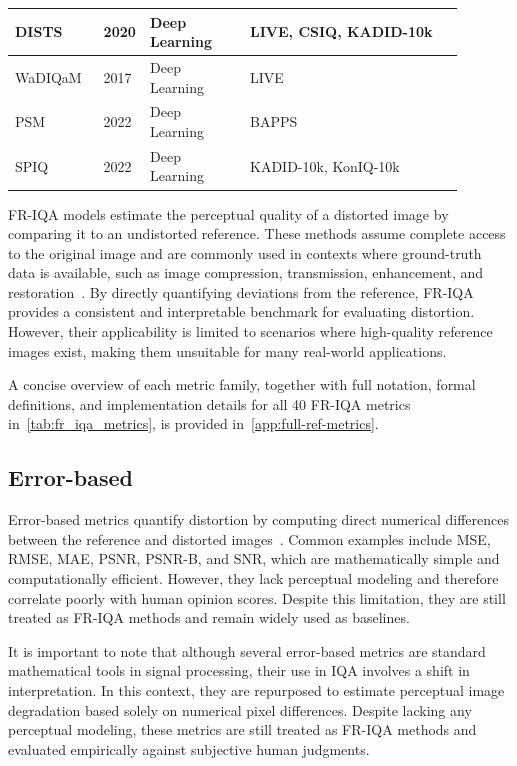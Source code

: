 \begin{longtable}{
p{0.15\linewidth}  %
p{0.05\linewidth}  %
p{0.22\linewidth}  %
p{0.47\linewidth}  %
}
    \acs{DISTS}~\cite{ding2020dists} & 2020 & Deep Learning & \acs{LIVE}, \acs{CSIQ}, \acs{KADID-10k} \\ \hline
    \acs{WaDIQaM}~\cite{bosse2017wadiqam} & 2017 & Deep Learning & \acs{LIVE} \\ \hline
    \acs{PSM}~\cite{ghildyal2022psm} & 2022 & Deep Learning & \acs{BAPPS} \\ \hline
    \acs{SPIQ}~\cite{chen2022spiq} & 2022 & Deep Learning & \acs{KADID-10k}, \acs{KonIQ-10k} \\ \hline
\end{longtable}

\acf{FR-IQA} models estimate the perceptual quality of a distorted image by comparing it to an undistorted reference. These methods assume complete access to the original image and are commonly used in contexts where ground-truth data is available, such as image compression, transmission, enhancement, and restoration~\cite{sheikh2006vif, wang2004image}. By directly quantifying deviations from the reference, \acs{FR-IQA} provides a consistent and interpretable benchmark for evaluating distortion. However, their applicability is limited to scenarios where high-quality reference images exist, making them unsuitable for many real-world applications.

A concise overview of each metric family, together with full notation, formal definitions, and implementation details for all 40 \acs{FR-IQA} metrics in~\autoref{tab:fr_iqa_metrics}, is provided in~\autoref{app:full-ref-metrics}.

\subsection{Error-based}\label{sec:error_based_metrics}

Error-based metrics quantify distortion by computing direct numerical differences between the reference and distorted images~\cite{wang2004image}. Common examples include \acf{MSE}, \acf{RMSE}, \acf{MAE}, \acf{PSNR}, \acf{PSNR-B}, and \acf{SNR}, which are mathematically simple and computationally efficient. However, they lack perceptual modeling and therefore correlate poorly with human opinion scores. Despite this limitation, they are still treated as \acs{FR-IQA} methods and remain widely used as baselines.

It is important to note that although several error-based metrics are standard mathematical tools in signal processing, their use in \acs{IQA} involves a shift in interpretation. In this context, they are repurposed to estimate perceptual image degradation based solely on numerical pixel differences. Despite lacking any perceptual modeling, these metrics are still treated as \acs{FR-IQA} methods and evaluated empirically against subjective human judgments.

